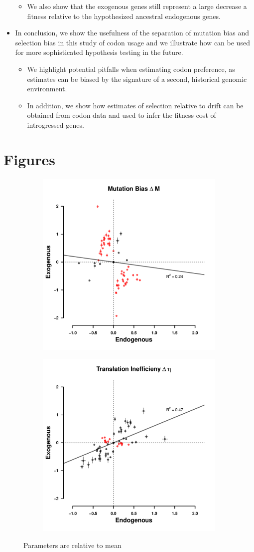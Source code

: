 \documentclass[12pt]{article}
\begin{document}
\begin{itemize}
\begin{itemize}
\begin{itemize}
		\end{itemize}
		\item We also show that the exogenous genes still represent a large decrease a fitness relative to the hypothesized ancestral endogenous genes.
	\end{itemize}	
	\item In conclusion, we show the usefulness of the separation of mutation bias and selection bias in this study of codon usage and we illustrate how \ROC can be used for more sophisticated hypothesis testing in the future.
	\begin{itemize}
		\item We highlight potential pitfalls when estimating codon preference, as estimates can be biased by the signature of a second, historical genomic environment.
		\item In addition, we show how estimates of selection relative to drift can be obtained from codon data and used to infer the fitness cost of introgressed genes.
	\end{itemize}
\end{itemize}

\clearpage

\section*{Figures}

\begin{figure}[h]
    \centering
    \begin{subfigure}
        \centering
        \includegraphics[width=.45\textwidth]{img/csp_corr_dm.pdf}
    \end{subfigure}
    \begin{subfigure}
        \centering
        \includegraphics[width=.45\textwidth]{img/csp_corr_deta.pdf}
    \end{subfigure}
    \caption{Parameters are relative to mean}
    \label{fig:csp_comp}
\end{figure}
\end{document}
